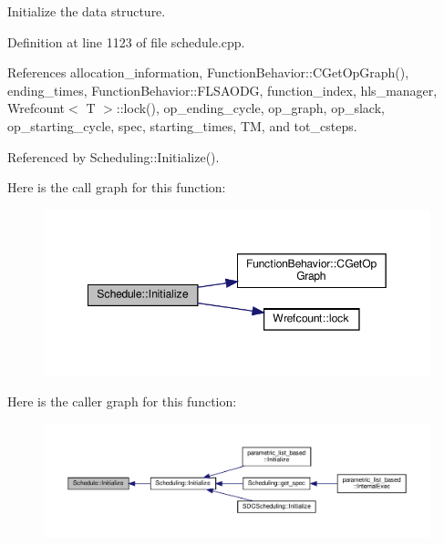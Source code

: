 Initialize the data structure. 



Definition at line 1123 of file schedule.\+cpp.



References allocation\+\_\+information, Function\+Behavior\+::\+C\+Get\+Op\+Graph(), ending\+\_\+times, Function\+Behavior\+::\+F\+L\+S\+A\+O\+DG, function\+\_\+index, hls\+\_\+manager, Wrefcount$<$ T $>$\+::lock(), op\+\_\+ending\+\_\+cycle, op\+\_\+graph, op\+\_\+slack, op\+\_\+starting\+\_\+cycle, spec, starting\+\_\+times, TM, and tot\+\_\+csteps.



Referenced by Scheduling\+::\+Initialize().

Here is the call graph for this function\+:
\nopagebreak
\begin{figure}[H]
\begin{center}
\leavevmode
\includegraphics[width=349pt]{df/d61/classSchedule_ae081e822e8e894d32cb3a0e991c31889_cgraph}
\end{center}
\end{figure}
Here is the caller graph for this function\+:
\nopagebreak
\begin{figure}[H]
\begin{center}
\leavevmode
\includegraphics[width=350pt]{df/d61/classSchedule_ae081e822e8e894d32cb3a0e991c31889_icgraph}
\end{center}
\end{figure}
\mbox{\label{classSchedule_adeef437f5a2674165df77031551f4f48}} 
